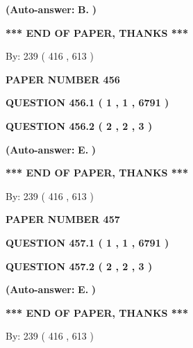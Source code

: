 \documentclass[12pt]{article}
\begin{document}
 
{\textbf{(Auto-answer:}}
{\textbf{\large{
B.}}}
{\textbf{)}}
 
 
   
   
   
   
\vspace{1.0in} 
{\textbf{\large{ *** END OF PAPER, THANKS *** }}} 
   
   
\hspace{1.0in} By: 
 239 ( 416 ,  613 )
   
   
   
   
\newpage 
\setcounter{page}{ 
   456001 } 
   
   
 {\textbf{ \Large{ PAPER NUMBER  456  }}}
   
   
   
   
  
  
{\textbf{\large{QUESTION
456.1 
 ( 1 , 1 , 6791 )
}}}
  
  
{\textbf{\large{QUESTION
456.2 
 ( 2 , 2 , 3 )
}}}
 
 
{\textbf{(Auto-answer:}}
{\textbf{\large{
E.}}}
{\textbf{)}}
 
 
   
   
   
   
\vspace{1.0in} 
{\textbf{\large{ *** END OF PAPER, THANKS *** }}} 
   
   
\hspace{1.0in} By: 
 239 ( 416 ,  613 )
   
   
   
   
\newpage 
\setcounter{page}{ 
   457001 } 
   
   
 {\textbf{ \Large{ PAPER NUMBER  457  }}}
   
   
   
   
  
  
{\textbf{\large{QUESTION
457.1 
 ( 1 , 1 , 6791 )
}}}
  
  
{\textbf{\large{QUESTION
457.2 
 ( 2 , 2 , 3 )
}}}
 
 
{\textbf{(Auto-answer:}}
{\textbf{\large{
E.}}}
{\textbf{)}}
 
 
   
   
   
   
\vspace{1.0in} 
{\textbf{\large{ *** END OF PAPER, THANKS *** }}} 
   
   
\hspace{1.0in} By: 
 239 ( 416 ,  613 )
   
   
   
   
\newpage 
\setcounter{page}{ 
   458001 } 
   
\end{document}

